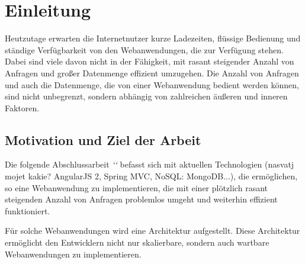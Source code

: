 \chapter{Einleitung}

Heutzutage erwarten die Internetnutzer kurze Ladezeiten, flüssige Bedienung und ständige Verfügbarkeit von den Webanwendungen, die zur Verfügung stehen. Dabei sind viele davon nicht in der Fähigkeit, mit rasant steigender Anzahl von Anfragen und großer Datenmenge effizient umzugehen. Die Anzahl von Anfragen und auch die Datenmenge, die von einer Webanwendung bedient werden können, sind nicht unbegrenzt, sondern abhängig von zahlreichen äußeren und inneren Faktoren. 

\section{Motivation und Ziel der Arbeit}

Die folgende Abschlussarbeit \textit{`\themaT`} befasst sich mit aktuellen Technologien (nasvatj mojet kakie? AngularJS 2, Spring MVC, NoSQL: MongoDB...), die ermöglichen, so eine Webanwendung zu implementieren, die mit einer plötzlich rasant steigenden Anzahl von Anfragen problemlos umgeht und weiterhin effizient funktioniert.

Für solche Webanwendungen wird eine Architektur aufgestellt. Diese Architektur ermöglicht den Entwicklern nicht nur skalierbare, sondern auch wartbare Webanwendungen zu implementieren. 







